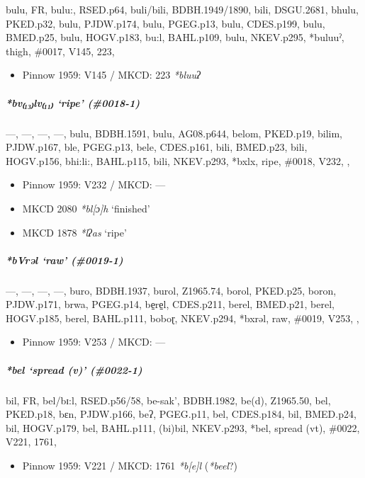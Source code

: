 \documentclass[a4paper,]{article}
\providecommand{\tightlist}{%
  \setlength{\itemsep}{0pt}\setlength{\parskip}{0pt}}
\let\oldsubparagraph\subparagraph
\renewcommand{\subparagraph}[1]{\oldsubparagraph{#1}\mbox{}}
\begin{document}
bulu, FR, bulu:, RSED.p64, buli/bili, BDBH.1949/1890, bili, DSGU.2681,
bhulu, PKED.p32, bulu, PJDW.p174, bulu, PGEG.p13, bulu, CDES.p199, bulu,
BMED.p25, bulu, HOGV.p183, bu:l, BAHL.p109, bulu, NKEV.p295, *buluuˀ,
thigh, \#0017, V145, 223,

\begin{itemize}
\tightlist
\item
  Pinnow 1959: V145 / MKCD: 223 \emph{*bluuʔ}
\end{itemize}

\subparagraph{\texorpdfstring{\emph{*bv₍₁₃₎lv₍₁₁₎} `ripe'
(\#0018-1)}{*bv₍₁₃₎lv₍₁₁₎ ripe (\#0018-1)}}\label{bvlv-ripe-0018-1}

---, ---, ---, ---, bulu, BDBH.1591, bulu, AG08.p644, belom, PKED.p19,
bilim, PJDW.p167, ble, PGEG.p13, bele, CDES.p161, bili, BMED.p23, bili,
HOGV.p156, bhi:li:, BAHL.p115, bili, NKEV.p293, *bxlx, ripe, \#0018,
V232, ,

\begin{itemize}
\item
  Pinnow 1959: V232 / MKCD: ---
\item
  MKCD 2080 \emph{*bl{[}ɔ{]}h} `finished'
\item
  MKCD 1878 \emph{*lʔas} `ripe'
\end{itemize}

\subparagraph{\texorpdfstring{\emph{*bVrəl} `raw'
(\#0019-1)}{*bVrəl raw (\#0019-1)}}\label{bvrux259l-raw-0019-1}

---, ---, ---, ---, buro, BDBH.1937, burol, Z1965.74, borol, PKED.p25,
boron, PJDW.p171, brwa, PGEG.p14, be̠re̠l, CDES.p211, berel, BMED.p21,
berel, HOGV.p185, berel, BAHL.p111, boboɽ, NKEV.p294, *bxrəl, raw,
\#0019, V253, ,

\begin{itemize}
\tightlist
\item
  Pinnow 1959: V253 / MKCD: ---
\end{itemize}

\subparagraph{\texorpdfstring{\emph{*bel} `spread (v)'
(\#0022-1)}{*bel spread (v) (\#0022-1)}}\label{bel-spread-v-0022-1}

bil, FR, bel/bɪ:l, RSED.p56/58, be-sak', BDBH.1982, be(d), Z1965.50,
bel, PKED.p18, bɛn, PJDW.p166, beʔ, PGEG.p11, bel, CDES.p184, bil,
BMED.p24, bil, HOGV.p179, bel, BAHL.p111, (bi)bil, NKEV.p293, *bel,
spread (vt), \#0022, V221, 1761,

\begin{itemize}
\tightlist
\item
  Pinnow 1959: V221 / MKCD: 1761 \emph{*b{[}e{]}l} (\emph{*beel}?)
\end{itemize}
\end{document}
